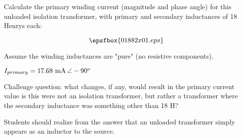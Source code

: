 

Calculate the primary winding current (magnitude and phase angle) for this unloaded isolation transformer, with primary and secondary inductances of 18 Henrys each:

$$\epsfbox{01882x01.eps}$$

Assume the winding inductances are "pure" (no resistive components).







$I_{primary} = 17.68 \hbox{ mA} \> \angle -90^o$

\vskip 10pt

Challenge question: what changes, if any, would result in the primary current value is this were not an isolation transformer, but rather a transformer where the secondary inductance was something other than 18 H?  







Students should realize from the answer that an unloaded transformer simply appears as an inductor to the source.




